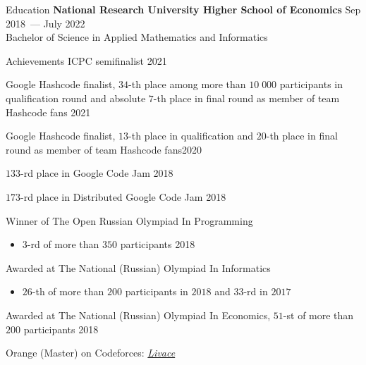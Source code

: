 \documentclass{resume} %
\begin{document}
\begin{rSection}{Education}
{\bf National Research University Higher School of Economics} \hfill {Sep 2018~--- July 2022} \\ 
Bachelor of Science in Applied Mathematics and Informatics
\begin{itemize}\end{itemize} %

\end{rSection}

\begin{rSection}{Achievements}
    ICPC semifinalist \hfill{2021}
    \begin{itemize}\end{itemize} %
    Google Hashcode finalist, $34$-th place among more than $10 \; 000$ participants in qualification round and absolute $7$-th place in final round as member of team Hashcode fans \hfill{2021} 
    \begin{itemize}\end{itemize} %
    Google Hashcode finalist, $13$-th place in qualification and $20$-th place in final round as member of team Hashcode fans\hfill{2020} 
    \begin{itemize}\end{itemize} %
    $133$-rd place in Google Code Jam \hfill{2018} 
    \begin{itemize}\end{itemize} %
    $173$-rd place in Distributed Google Code Jam \hfill{2018} 
    \begin{itemize}\end{itemize} %
    Winner of The Open Russian Olympiad In Programming 
    \begin{itemize}
        \item $3$-rd of more than $350$ participants \hfill{2018}
    \end{itemize}
    Awarded at The National (Russian) Olympiad In Informatics
    \begin{itemize}
        \item $26$-th of more than $200$ participants in $2018$ and $33$-rd in $2017$
    \end{itemize}
    Awarded at The National (Russian) Olympiad In Economics, $51$-st of more than $200$ participants \hfill{2018}
    
    Orange (Master) on Codeforces: \href{http://codeforces.com/profile/livace?locale=en}{\color{link}\textit{Livace}}
    
\end{rSection}
\end{document}
